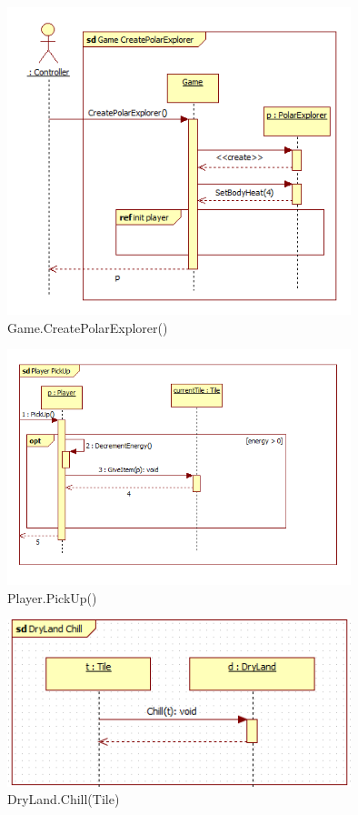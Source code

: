 \begin{figure}[H]
	\begin{center}
		\includegraphics[width=10cm]{chapters/chapter03/seqdiag/Game_CreatePolarExplorer.png}
		\caption{Game.CreatePolarExplorer()}
		\label{fig:GameCreatePolarExplorer}
	\end{center}
\end{figure}
\begin{figure}[H]
	\begin{center}
		\includegraphics[width=10cm]{chapters/chapter03/seqdiag/Player_PickUp.png}
		\caption{Player.PickUp()}
		\label{fig:PlayerPickUp}
	\end{center}
\end{figure}
\begin{figure}[H]
	\begin{center}
		\includegraphics[width=10cm]{chapters/chapter03/seqdiag/DryLand_Chill.png}
		\caption{DryLand.Chill(Tile)}
		\label{fig:DryLandChill}
	\end{center}
\end{figure}
